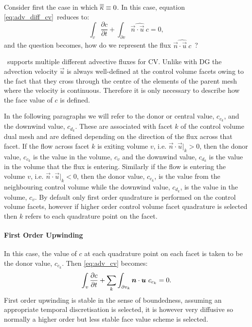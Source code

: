 Consider first the case in which $\overline{\overline{\kappa}}\equiv 0$. In this case, equation \eqref{eq:adv_diff_cv}\ reduces to:
\begin{equation}\label{eq:adv_cv}
  \int_v \frac{\partial c}{\partial t} +
    \int_{\partial v} \widehat{\vec{n}\cdot\vec{u}~c}
    = 0,
\end{equation}
and the question becomes, how do we represent the flux $\widehat{\vec{n}\cdot\vec{u}~c}$\ ?

\fluidity\ supports multiple different advective fluxes for CV.  Unlike with DG the advection velocity $\vec{u}$ is always well-defined at the control volume facets owing to the fact that they cross through the centre of the elements of the parent mesh where the velocity is continuous.  Therefore it is only necessary to describe how the face value of $c$ is defined.

In the following paragraphs we will refer to the donor or central value, $c_{c_k}$, and the downwind value, $c_{d_k}$.  These are associated with facet $k$ of the control volume dual mesh and are defined depending on the direction of the flux across that facet.  If the flow across facet $k$ is exiting volume $v$, i.e. $\vec{n}\cdot\vec{u}|_k>0$, then the donor value, $c_{c_k}$ is the value in the volume, $c_v$ and the downwind value, $c_{d_k}$ is the value in the volume that the flux is entering.  Similarly if the flow is entering the volume $v$, i.e. $\vec{n}\cdot\vec{u}|_k<0$, then the donor value, $c_{c_k}$, is the value from the neighbouring control volume while the downwind value, $c_{d_k}$, is the value in the volume, $c_v$.  By default only first order quadrature is performed on the control volume facets, however if higher order control volume facet quadrature is selected then $k$ refers to each quadrature point on the facet.

\paragraph{First Order Upwinding} \label{sec:cv_fou}

In this case, the value of $c$ at each quadrature point on each facet is taken to be the donor value, $c_{c_k}$.  Then \eqref{eq:adv_cv} becomes:
\begin{equation}
  \int_v \frac{\partial c}{\partial t} +
    \sum_k\int_{\partial v_k} {\mbox{\boldmath$n$}}\cdot{\mbox{\boldmath$u$}}~c_{c_k}
    = 0.
\end{equation}
First order upwinding is stable in the sense of boundedness, assuming an appropriate temporal discretisation is selected, it is however very diffusive so normally a higher order but less stable face value scheme is selected.

